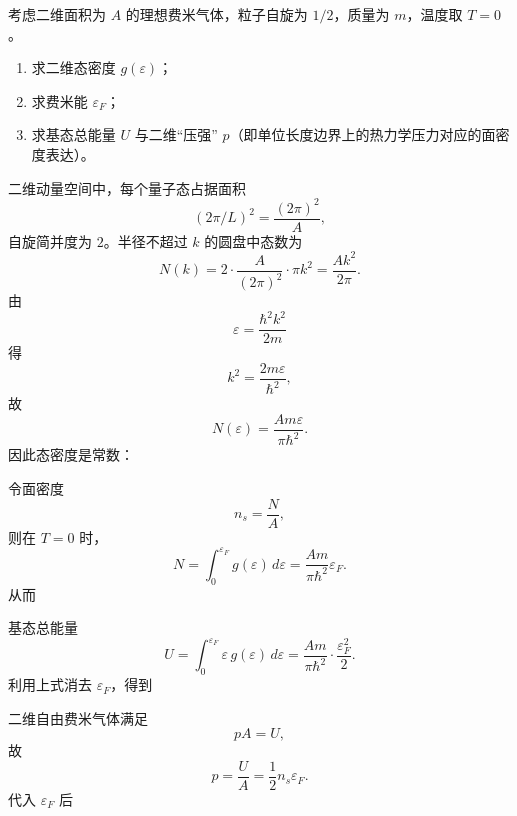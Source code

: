 \begin{question}[20分]
考虑二维面积为 $A$ 的理想费米气体，粒子自旋为 $1/2$，质量为 $m$，温度取 $T=0$。
\begin{enumerate}[label=（\arabic*）,leftmargin=2.8em,itemsep=0.2em]
\item 求二维态密度 $g(\varepsilon)$；
\item 求费米能 $\varepsilon_F$；
\item 求基态总能量 $U$ 与二维“压强” $p$（即单位长度边界上的热力学压力对应的面密度表达）。
\end{enumerate}
\begin{solution}

二维动量空间中，每个量子态占据面积
\[
(2\pi/L)^2=\frac{(2\pi)^2}{A},
\]
自旋简并度为 $2$。半径不超过 $k$ 的圆盘中态数为
\[
N(k)=2\cdot \frac{A}{(2\pi)^2}\cdot \pi k^2=\frac{Ak^2}{2\pi}.
\]
由
\[
\varepsilon=\frac{\hbar^2k^2}{2m}
\]
得
\[
k^2=\frac{2m\varepsilon}{\hbar^2},
\]
故
\[
N(\varepsilon)=\frac{Am\varepsilon}{\pi\hbar^2}.
\]
因此态密度是常数：

令面密度
\[
n_s=\frac{N}{A},
\]
则在 $T=0$ 时，
\[
N=\int_0^{\varepsilon_F}g(\varepsilon)\,d\varepsilon
=\frac{Am}{\pi\hbar^2}\varepsilon_F.
\]
从而

基态总能量
\[
U=\int_0^{\varepsilon_F}\varepsilon\,g(\varepsilon)\,d\varepsilon
=\frac{Am}{\pi\hbar^2}\cdot \frac{\varepsilon_F^2}{2}.
\]
利用上式消去 $\varepsilon_F$，得到

二维自由费米气体满足
\[
pA=U,
\]
故
\[
p=\frac{U}{A}=\frac12 n_s\varepsilon_F.
\]
代入 $\varepsilon_F$ 后
\end{solution}
\end{question}

